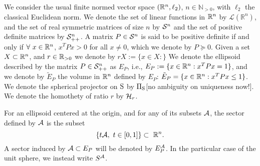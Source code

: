 We consider the usual finite normed vector space $(\mathbb{R}^n,\ell_2)$, $n \in \mathbb{N}_{> 0}$, with $\ell_2$ the classical Euclidean norm. We denote the set of linear functions in $\mathbb{R}^n$ by $\mathcal{L}(\mathbb{R}^n)$, and the set of real symmetric matrices of size $n$ by $\mathcal{S}^n$ and the set of positive definite matrices by $\mathcal{S}^n_{++}$. A matrix $P \in \mathcal{S}^n$ is said to be positive definite if and only if $\forall\ x \in \mathbb{R}^n$, $x^TPx > 0$ for all $x \not = 0$, which we denote by $P \succeq 0$. Given a set $X \subset \mathbb{R}^n$, and $r \in \mathbb{R}_{> 0}$ we denote by $rX := \{x \in X :\}$ We denote the ellipsoid described by the matrix $P \in \mathcal{S}^n_{++}$ as $E_P$, i.e., $E_P:= \{x \in \mathbb{R}^n: x^TPx = 1\}$, and we denote by $\tilde{E}_P$ the volume in $\mathbb{R}^n$ defined by $E_P$: $\tilde{E}_P = \{x \in \mathbb{R}^n: x^TPx \leq 1\}$. We denote the spherical projector on $\text{S}$ by $\Pi_{\text{S}}$[no ambiguity on uniqueness now!]. We denote the homothety of ratio $r$ by $\mathcal{H}_{r}$. 


For an ellipsoid centered at the origin, and for any of its subsets $\mathcal{A}$, the sector defined by $\mathcal{A}$ is the subset $$\{t \calA, \ t \in [0,1]\} \subset\ \R^n.$$ A sector induced by $\mathcal{A} \subset E_P$ will be denoted by $E_P^{\mathcal{A}}$. In the particular case of the unit sphere, we instead write $S^{\mathcal{A}}$.

